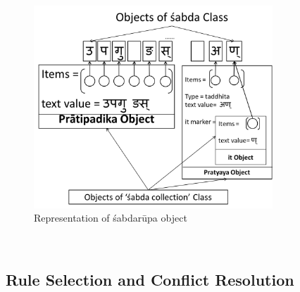 \documentclass[11pt]{article}
\begin{document}
\begin{figure}[h]
    \centering
	\includegraphics[width=0.8\textwidth]{environment}
    \caption{Representation of śabdarūpa object}
    \label{fig:enc}
\end{figure}

\\


\subsection{Rule Selection and Conflict Resolution}
\label{sect:confRes}
\end{document}
